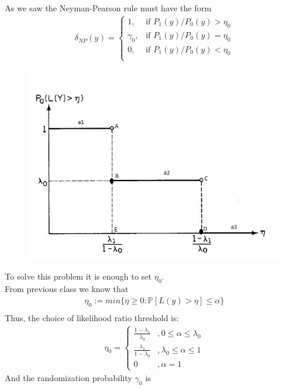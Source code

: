 \documentclass[12pt]{report}
\begin{document}
As we saw the Neyman-Pearson rule must have the form\\
\begin{align*}
 \delta_{NP}(y) = \begin{cases}
1, &  \text{if }P_1(y)/P_0(y)>\eta_0 \\
\gamma_0, & \text{if }P_1(y)/P_0(y)=\eta_0\\
0, &  \text{if }P_1(y)/P_0(y) < \eta_0 \\
\end{cases} 
\end{align*}
\begin{figure}[h]
\centering
\includegraphics[scale=0.75]{Figures/img}
\label{fig}
\end{figure}
To solve this problem it is enough to set $\eta_0$.\\
From previous class we know that
\begin{align*}
\eta_0 := min \{ \eta \geq 0 : \mathbb{P}[L(y)>\eta] \leq \alpha\} \\
\end{align*}
Thus, the choice of likelihood ratio threshold is:\\
\begin{align*}
\eta_0=\left\{
\begin{array}{cc}
\frac{1-\lambda_1}{\lambda_0}  &,  0\leq\alpha\leq\lambda_0\\
\frac{\lambda_1}{1-\lambda_0}  &,  \lambda_0\leq\alpha\leq1\\
0 &, \alpha=1
\end{array}\right.
\end{align*}
And the randomization  probability $\gamma_0$ is\\
\end{document}
